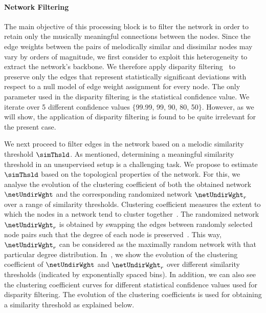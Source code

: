 {\paragraph{Network Filtering}
\label{sec:network_filtering}

The main objective of this processing block is to filter the network in order to retain only the musically meaningful connections between the nodes. Since the edge weights between the pairs of melodically similar and dissimilar nodes may vary by orders of magnitude, we first consider to exploit this heterogeneity to extract the network's backbone. We therefore apply disparity filtering~\citep{Serrano09PNAS} to preserve only the edges that represent statistically significant deviations with respect to a null model of edge weight assignment for every node. The only parameter used in the disparity filtering is the statistical confidence value. We iterate over 5 different confidence values $\lbrace$99.99, 99, 90, 80, 50$\rbrace$. However, as we will show, the application of disparity filtering is found to be quite irrelevant for the present case.

We next proceed to filter edges in the network based on a melodic similarity threshold $\simThsld$. As mentioned, determining a meaningful similarity threshold in an unsupervised setup is a challenging task. We propose to estimate $\simThsld$ based on the topological properties of the network. For this, we analyse the evolution of the clustering coefficient of both the obtained network $\netUndirWght$ and the corresponding randomized network $\netUndirWght_r$ over a range of similarity thresholds. Clustering coefficient measures the extent to which the nodes in a network tend to cluster together~\citep{newman2003structure}. The randomized network $\netUndirWght_r$ is obtained by swapping the edges between randomly selected node pairs such that the degree of each node is preserved~\citep{maslov2002specificity}. This way, $\netUndirWght_r$ can be considered as the maximally random network with that particular degree distribution. In~, we show the evolution of the clustering coefficient of $\netUndirWght$ and $\netUndirWght_r$ over different similarity thresholds (indicated by exponentially spaced bins). In addition, we can also see the clustering coefficient curves for different statistical confidence values used for disparity filtering. The evolution of the clustering coefficients is used for obtaining a similarity threshold as explained below.

}
